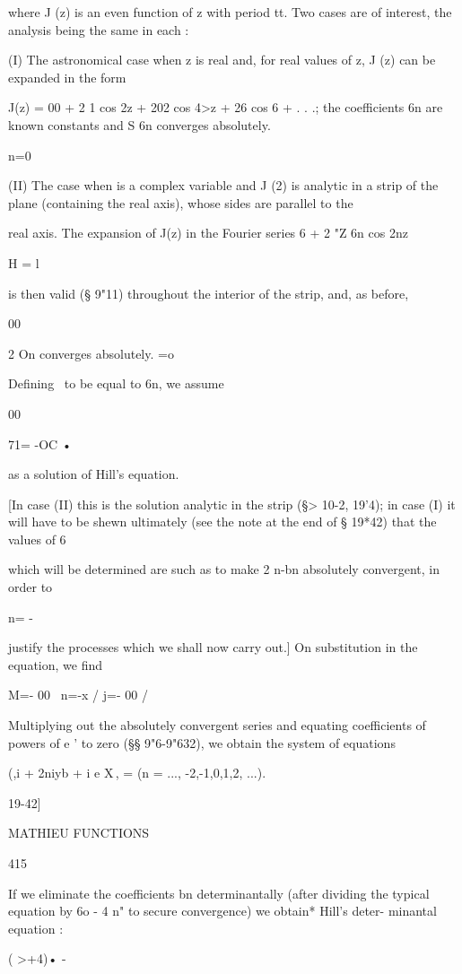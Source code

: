 where J (z) is an even function of z with period tt. Two cases are of
interest, the analysis being the same in each :

(I) The astronomical case when z is real and, for real values of z, J
(z) can be expanded in the form

J(z) = 00 + 2 1 cos 2z + 202 cos 4>z + 26 cos 6 + . . .; the
coefficients 6n are known constants and S 6n converges absolutely.

n=0

(II) The case when is a complex variable and J (2) is analytic in a
strip of the plane (containing the real axis), whose sides are
parallel to the

real axis. The expansion of J(z) in the Fourier series 6 + 2 "Z 6n cos
2nz

H = l

is then valid (§ 9"11) throughout the interior of the strip, and, as
before,

00

2 On converges absolutely. =o

Defining \ to be equal to 6n, we assume

00

71= -OC •

as a solution of Hill's equation.

[In case (II) this is the solution analytic in the strip (§> 10-2,
19'4); in case (I) it will have to be shewn ultimately (see the note
at the end of § 19*42) that the values of 6

which will be determined are such as to make 2 n-bn absolutely
convergent, in order to

n= -

justify the processes which we shall now carry out.] On substitution
in the equation, we find

M=- 00 \ n=-x / j=- 00 /

Multiplying out the absolutely convergent series and equating
coefficients of powers of e ' to zero (§§ 9"6-9"632), we obtain the
system of equations

(,i + 2niyb + i e X\,, = (n = ..., -2,-1,0,1,2, ...).

19-42]

MATHIEU FUNCTIONS

415

If we eliminate the coefficients bn determinantally (after dividing
the typical equation by 6o - 4 n" to secure convergence) we obtain*
Hill's deter- minantal equation :

( >+4)• -


